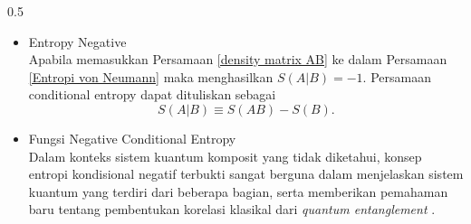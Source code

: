 \begin{frame}
\begin{columns}[T]
\begin{column}{0.5\textwidth}
\begin{itemize}
                yang sesuai dengan sistem klasik \footcite{barnett2009quantum} yang berkorelasi.
            \item Entropy Negative\\
                Apabila memasukkan Persamaan \ref{density matrix AB} ke dalam Persamaan \ref{Entropi von Neumann} maka menghasilkan $S(A|B)=-1$. Persamaan conditional entropy dapat dituliskan sebagai
                \begin{equation}
                    S(A|B) \equiv S(AB) - S(B).
                \end{equation}
             \item Fungsi Negative Conditional Entropy\\
                Dalam konteks sistem kuantum komposit yang tidak diketahui, konsep entropi kondisional negatif terbukti sangat berguna dalam menjelaskan sistem kuantum yang terdiri dari beberapa bagian, serta memberikan pemahaman baru tentang pembentukan korelasi klasikal dari \textit{quantum entanglement} \cite{annur2022kepemilikan}.
        \end{itemize}
    \end{column}
  \end{columns}   
\end{frame}

